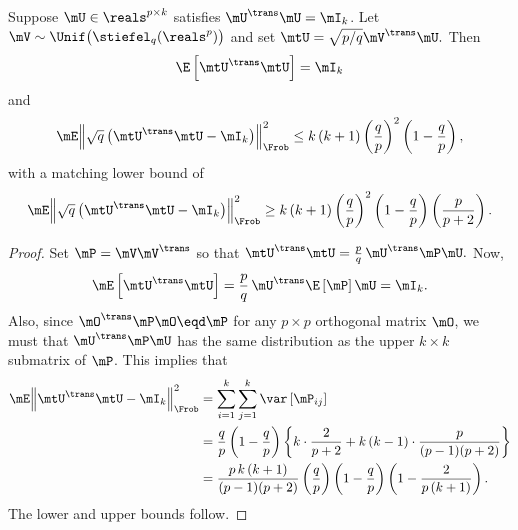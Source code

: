\begin{lemma}\label{L:project-kframe-dot-products}
    Suppose $\mU \in \reals^{p \times k}$ satisfies $\mU^\trans \mU = \mI_k$.
    Let $\mV \sim \Unif\big( \stiefel_q(\reals^p) \big)$ and set
    \(
        \mtU = \sqrt{p/q} \mV^\trans \mU.
    \)
    Then 
    \[
        \E \left[ \mtU^\trans \mtU \right] = \mI_k
    \]
    and
    \[
        \mE \Big\| 
            \sqrt{q} \, \big(  \mtU^\trans \mtU - \mI_k \big) 
        \Big\|_\Frob^2
                \leq
                k \, (k+1)
                \left( \frac{q}{p} \right)^2                
                \left( 1 - \frac{q}{p} \right),
    \]
    with a matching lower bound of
    \[
        \mE \Big\| 
            \sqrt{q} \, \big(  \mtU^\trans \mtU - \mI_k \big) 
        \Big\|_\Frob^2
            \geq
            k \, (k+1)
            \left( \frac{q}{p} \right)^2
            \left( 1 - \frac{q}{p} \right)
            \left(
            \frac{p}{p+2}
            \right).
    \]
\end{lemma}
\begin{proof}
    Set $\mP = \mV \mV^\trans$ so that
    \(
        \mtU^\trans \mtU
        =
        \frac{p}{q} \, 
        \mU^\trans \mP \mU.
    \)
    Now,
    \[
        \mE \left[ \mtU^\trans \mtU \right]
            =
                \frac{p}{q} \,
                \mU^\trans
                \E \left[ \mP \right]
                \mU
            =
            \mI_k.
    \]
    Also, since $\mO^\trans \mP \mO \eqd \mP$ for any $p \times p$ orthogonal
    matrix $\mO$, we must that $\mU^\trans \mP \mU$ has the same distribution
    as the upper $k \times k$ submatrix of $\mP$.  This implies that
    \begin{align*}
        \mE \Big\| 
            \mtU^\trans \mtU - \mI_k
        \Big\|_\Frob^2
            &= \sum_{i=1}^k \sum_{j=1}^k
                     \var \left[ \mP_{ij} \right] \\
            &= \frac{q}{p} \left( 1 - \frac{q}{p} \right)
               \bigg\{ 
                    k \cdot \frac{2}{p + 2} 
                    +
                    k \, (k-1)
                    \cdot
                    \frac{p}{ (p-1) (p+2) }
               \bigg\} \\
            &= 
               \frac{p \, k \, (k+1) }{ (p-1) (p+2) }
               \left( \frac{q}{p} \right) \left( 1 - \frac{q}{p} \right)
               \left(
                    1
                    -
                    \frac{2}{ p \, (k+1) }
               \right).
    \end{align*}
    The lower and upper bounds follow.
\end{proof}

